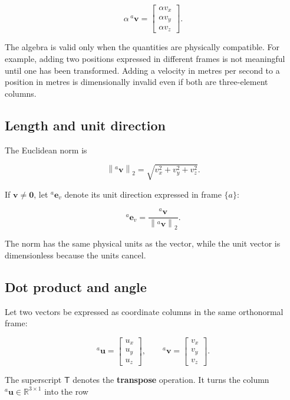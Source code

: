 \documentclass[
  australian,
  12pt,
  letterpaper,
  DIV=11,
  numbers=noendperiod,
  twoside]{scrreprt}
\begin{document}
\[
\alpha\,{}^{a}\mathbf{v}
=
\begin{bmatrix}
\alpha v_x \\
\alpha v_y \\
\alpha v_z
\end{bmatrix}.
\]

The algebra is valid only when the quantities are physically compatible.
For example, adding two positions expressed in different frames is not
meaningful until one has been transformed. Adding a velocity in metres
per second to a position in metres is dimensionally invalid even if both
are three-element columns.

\subsection{Length and unit
direction}\label{sec-linear-algebra-vector-norm}

The Euclidean norm is

\[
\left\|{}^{a}\mathbf{v}\right\|_2
=
\sqrt{v_x^2+v_y^2+v_z^2}.
\]

If \(\mathbf{v}\neq\mathbf{0}\), let \({}^{a}\mathbf{e}_v\) denote its
unit direction expressed in frame \(\{a\}\):

\[
{}^{a}\mathbf{e}_v
=
\frac{{}^{a}\mathbf{v}}
{\left\|{}^{a}\mathbf{v}\right\|_2}.
\]

The norm has the same physical units as the vector, while the unit
vector is dimensionless because the units cancel.

\subsection{Dot product and angle}\label{dot-product-and-angle}

Let two vectors be expressed as coordinate columns in the same
orthonormal frame:

\[
{}^{a}\mathbf{u}
=
\begin{bmatrix}
u_x\\
u_y\\
u_z
\end{bmatrix},
\qquad
{}^{a}\mathbf{v}
=
\begin{bmatrix}
v_x\\
v_y\\
v_z
\end{bmatrix}.
\]

The superscript \(\mathsf{T}\) denotes the \textbf{transpose} operation.
It turns the column \({}^{a}\mathbf{u}\in\mathbb{R}^{3\times 1}\) into
the row
\end{document}

